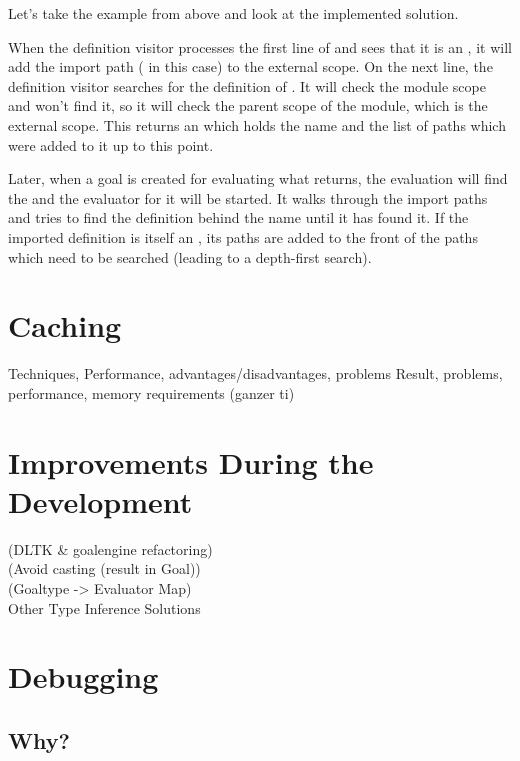 \documentclass[12pt,halfparskip,DIV11,BCOR10mm]{scrreprt}
\begin{document}
Let's take the example from above and look at the implemented solution.

When the definition visitor processes the first line of  and sees that it is an , it will add the import path ( in this case) to the external scope. On the next line, the definition visitor searches for the definition of . It will check the module scope and won't find it, so it will check the parent scope of the module, which is the external scope. This returns an  which holds the name and the list of  paths which were added to it up to this point.

Later, when a goal is created for evaluating what  returns, the evaluation will find the  and the evaluator for it will be started. It walks through the import paths and tries to find the definition behind the name  until it has found it. If the imported definition is itself an , its paths are added to the front of the paths which need to be searched (leading to a depth-first search).


\section{Caching}
 Techniques, Performance, advantages/disadvantages, problems
 Result, problems, performance, memory requirements (ganzer ti)


\section{Improvements During the Development}

 (DLTK \& goalengine refactoring) \\
 (Avoid casting (result in Goal))\\
 (Goaltype -> Evaluator Map)\\
Other Type Inference Solutions


\section{Debugging}

\subsection{Why?}
\end{document}

